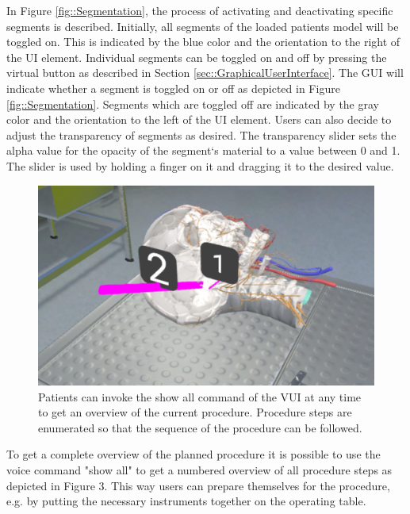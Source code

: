 In Figure \ref{fig::Segmentation}, the process of activating and deactivating specific segments is described.
Initially, all segments of the loaded patients model will be toggled on.
This is indicated by the blue color and the orientation to the right of the UI element.
Individual segments can be toggled on and off by pressing the virtual button as described in Section \ref{sec::GraphicalUserInterface}.
The GUI will indicate whether a segment is toggled on or off as depicted in Figure \ref{fig::Segmentation}.
Segments which are toggled off are indicated by the gray color and the orientation to the left of the UI element.
Users can also decide to adjust the transparency of segments as desired.
The transparency slider sets the alpha value for the opacity of the segment‘s material to a value between 0 and 1.
The slider is used by holding a finger on it and dragging it to the desired value.

\begin{figure}[ht]
  \centering
  \includegraphics[width=\linewidth]{images/implementation/features/visualization/show_all.png}
  \caption{\label{fig::ShowAll}Patients can invoke the show all command of the VUI at any time to get an overview of the current procedure. Procedure steps are enumerated so that the sequence of the procedure can be followed.}
\end{figure}

To get a complete overview of the planned procedure it is possible to use the voice command "show all" to get a numbered overview of all procedure steps as depicted in Figure 3. 
This way users can prepare themselves for the procedure, e.g. by putting the necessary instruments together on the operating table.

